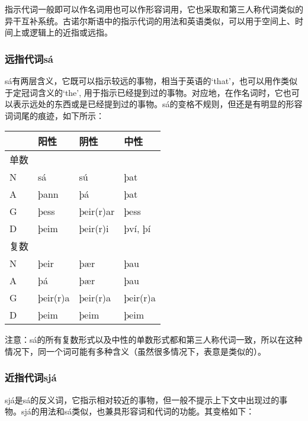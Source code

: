 指示代词一般即可以作名词用也可以作形容词用，它也采取和第三人称代词类似的异干互补系统。古诺尔斯语中的指示代词的用法和英语类似，可以用于空间上、时间上或逻辑上的近指或远指。

\subsubsection{远指代词sá}

sá有两层含义，它既可以指示较远的事物，相当于英语的`that‌'，也可以用作类似于定冠词含义的`the‌',
用于指示已经提到过的事物。对应地，在作名词时，它也可以表示远处的东西或是已经提到过的事物。sá的变格不规则，但还是有明显的形容词词尾的痕迹，如下所示：

\begin{longtable}{llll}
    \toprule
         & 阳性     & 阴性      & 中性     \\
    \midrule
    \endhead
    \bottomrule
    \endfoot
    单数 &          &           &          \\
    N    & sá       & sú        & þat      \\
    A    & þann     & þá        & þat      \\
    G    & þess     & þeir(r)ar & þess     \\
    D    & þeim     & þeir(r)i  & því, þí  \\
    复数 &          &           &          \\
    N    & þeir     & þær       & þau      \\
    A    & þá       & þær       & þau      \\
    G    & þeir(r)a & þeir(r)a  & þeir(r)a \\
    D    & þeim     & þeim      & þeim     \\
\end{longtable}

注意：sá的所有复数形式以及中性的单数形式都和第三人称代词一致，所以在这种情况下，同一个词可能有多种含义（虽然很多情况下，表意是类似的）。

\subsubsection{近指代词sjá}

sjá是sá的反义词，它指示相对较近的事物，但一般不提示上下文中出现过的事物。sjá的用法和sá类似，也兼具形容词和代词的功能。其变格如下：

